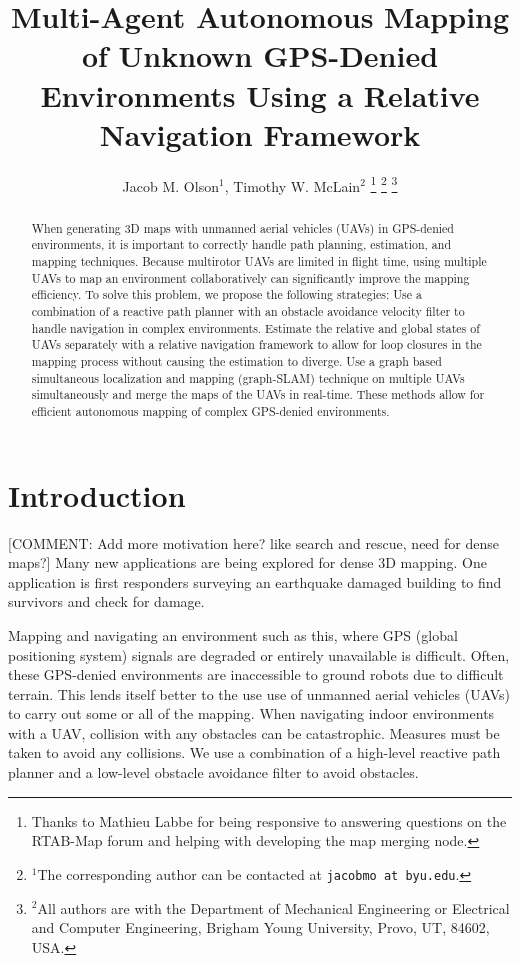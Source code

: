 \documentclass[letterpaper, 10 pt, conference]{ieeeconf}  %
\title{\LARGE \bf
Multi-Agent Autonomous Mapping of Unknown GPS-Denied Environments Using a Relative Navigation Framework}
\author{Jacob M. Olson$^{1}$, Timothy W. McLain$^{2}$%
\thanks{Thanks to Mathieu Labbe for being responsive to answering questions on the RTAB-Map forum and helping with developing the map merging node.}%
\thanks{$^{1}$The corresponding author can be contacted at
        {\tt\small jacobmo at byu.edu}.}%
\thanks{$^{2}$All authors are with the Department of Mechanical Engineering or Electrical and Computer Engineering,
        Brigham Young University, Provo, UT, 84602, USA.}%
}
\newcommand{\comment}[1]{{\color{red}[COMMENT: #1]}}
\begin{document}
\maketitle
\thispagestyle{empty}
\pagestyle{empty}


\begin{abstract}

When generating 3D maps with unmanned aerial vehicles (UAVs) in GPS-denied environments, it is important to correctly handle path planning, estimation, and mapping techniques. Because multirotor UAVs are limited in flight time, using multiple UAVs to map an environment collaboratively can significantly improve the mapping efficiency. To solve this problem, we propose the following strategies: Use a combination of a reactive path planner with an obstacle avoidance velocity filter to handle navigation in complex environments. Estimate the relative and global states of UAVs separately with a relative navigation framework to allow for loop closures in the mapping process without causing the estimation to diverge. Use a graph based simultaneous localization and mapping (graph-SLAM) technique on multiple UAVs simultaneously and merge the maps of the UAVs in real-time. These methods allow for efficient autonomous mapping of complex GPS-denied environments.

\end{abstract}


\section{Introduction}

\comment{Add more motivation here? like search and rescue, need for dense maps?}
Many new applications are being explored for dense 3D mapping. One application is first responders surveying an earthquake damaged building to find survivors and check for damage.

Mapping and navigating an environment such as this, where GPS (global positioning system) signals are degraded or entirely unavailable is difficult. Often, these GPS-denied environments are inaccessible to ground robots due to difficult terrain. This lends itself better to the use use of unmanned aerial vehicles (UAVs) to carry out some or all of the mapping. When navigating indoor environments with a UAV, collision with any obstacles can be catastrophic. Measures must be taken to avoid any collisions. We use a combination of a high-level reactive path planner and a low-level obstacle avoidance filter to avoid obstacles.
\end{document}
